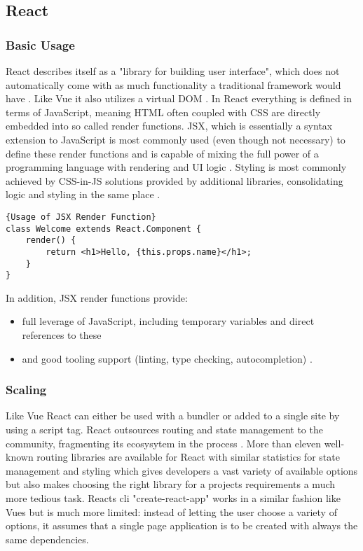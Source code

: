 
\subsection{React}

\subsubsection{Basic Usage}
React describes itself as a "library for building user interface", which does not automatically come with as much functionality a traditional framework would have \cite[p.~2]{LearningReactBanks:book}. Like Vue it also utilizes a virtual DOM \cite[p.~81]{LearningReactBanks:book}. In React everything is defined in terms of JavaScript, meaning HTML often coupled with CSS are directly embedded into so called render functions. JSX, which is essentially a syntax extension to JavaScript \cite{ReactJSX:online} is most commonly used (even though not necessary) to define these render functions and is capable of mixing the full power of a programming language with rendering and UI logic \cite{ComparisonVue:online}. Styling is most commonly achieved by CSS-in-JS solutions provided by additional libraries, consolidating logic and styling in the same place \cite{islam2017reactjs:article}. \newline

\begin{lstlisting}[caption=Usage of JSX Render Function, captionpos=b, style=htmlcssjs]{Usage of JSX Render Function}
class Welcome extends React.Component {
    render() {
        return <h1>Hello, {this.props.name}</h1>;
    }
}
\end{lstlisting}

In addition, JSX render functions provide:
\begin{itemize}
    \item full leverage of JavaScript, including temporary variables and direct references to these
    \item and good tooling support (linting, type checking, autocompletion) \cite{ComparisonVue:online}.
\end{itemize}

\subsubsection{Scaling}
Like Vue React can either be used with a bundler or added to a single site by using a script tag. React outsources routing and state management to the community, fragmenting its ecosysytem in the process \cite{ComparisonVue:online}. More than eleven well-known routing libraries are available for React with similar statistics for state management and styling which gives developers a vast variety of available options but also makes choosing the right library for a projects requirements a much more tedious task. Reacts cli "create-react-app" works in a similar fashion like Vues but is much more limited: instead of letting the user choose a variety of options, it assumes that a single page application is to be created with always the same dependencies.

